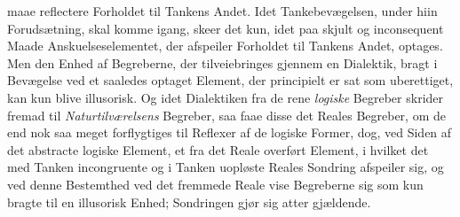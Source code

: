 maae reflectere Forholdet til Tankens Andet. Idet Tankebevægelsen,
under hiin Forudsætning, skal komme igang, skeer
det kun, idet paa skjult og inconsequent Maade Anskuelseselementet,
der afspeiler Forholdet til Tankens Andet, optages.
Men den Enhed af Begreberne, der tilveiebringes gjennem en
Dialektik, bragt i Bevægelse ved et saaledes optaget Element,
der principielt er sat som uberettiget, kan kun blive illusorisk.
Og idet Dialektiken fra de rene \emph{logiske} Begreber skrider
fremad til \emph{Naturtilværelsens} Begreber, saa faae disse det
Reales Begreber, om de end nok saa meget forflygtiges til
Reflexer af de logiske Former, dog, ved Siden af det abstracte
 logiske Element, et fra det Reale overført Element, i hvilket
det med Tanken incongruente og i Tanken uopløste Reales
Sondring afspeiler sig, og ved denne Bestemthed ved det fremmede
Reale vise Begreberne sig som kun bragte til en illusorisk
Enhed; Sondringen gjør sig atter gjældende.

